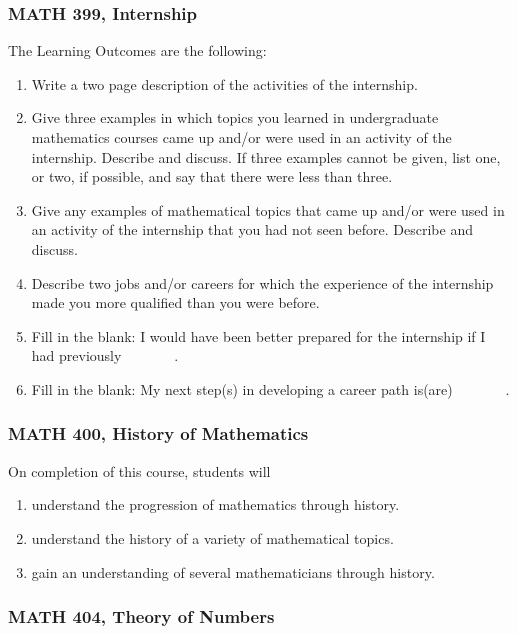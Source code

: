 \documentclass[11pt]{article}
\newenvironment{alphalist}{
\begin{enumerate}[label=(\arabic*),widest=107 ,leftmargin=25pt, itemsep=0pt]}
{\end{enumerate}}
\begin{document}
\subsubsection{MATH 399, Internship}
The Learning Outcomes are the following:
\begin{alphalist}
    \item Write a two page description of the activities of the 
    internship.
    \item Give three examples in which topics you learned in 
    undergraduate mathematics courses came up and/or were used in an 
    activity of the internship. Describe and discuss. 
    If three examples cannot be given, list one, or two, if possible, 
    and say that there were less than three.
    \item Give any examples of mathematical topics that came up 
    and/or were used in an activity of the internship that you had 
    not seen before. Describe and discuss. 
    \item Describe two jobs and/or careers for which the experience 
    of the internship made you more qualified than you were before.
    \item Fill in the blank: I would have been better prepared for 
    the internship if I had previously \underline{$\phantom{xxxxxx}$}.
    \item Fill in the blank: My next step(s) in developing a career path is(are) 
    \underline{$\phantom{xxxxxx}$}.
\end{alphalist}

\subsubsection{MATH 400, History of Mathematics}

On completion of this course, students will 
\begin{alphalist}
    \item understand the progression of mathematics through history.
    \item understand the history of a variety of mathematical topics.
    \item gain an understanding of several mathematicians through history.
\end{alphalist}

\subsubsection{MATH 404, Theory of Numbers}
\end{document}
